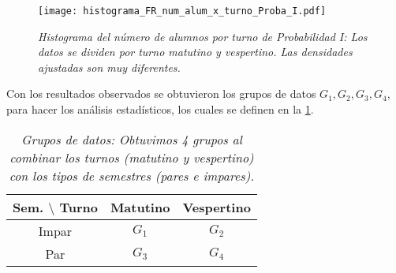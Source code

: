 \begin{figure}[h]
\centering
\texttt{[image: histograma\_FR\_num\_alum\_x\_turno\_Proba\_I.pdf]} %
\caption[\textit{Histograma del número de alumnos por turno: Probabilidad I}]{\textit{Histograma del número de alumnos por turno de Probabilidad I: Los datos se dividen por turno matutino y vespertino. Las densidades ajustadas son muy diferentes.}}\label{HistAlumTurnoProbaI}
\end{figure}

Con los resultados observados se obtuvieron los grupos de datos $G_{1}, G_{2}, G_{3}, G_{4}$, para hacer los análisis estadísticos, los cuales se definen en la \tablename{\ref{GposDatos}}.

\begin{table}[h]
\centering
\begin{tabular}{|c|c|c|}
\hline 
\textbf{Sem.} $\setminus$ \textbf{Turno} & \textbf{Matutino} & \textbf{Vespertino} \\ 
\hline 
Impar & $G_{1}$ & $G_{2}$ \\ 
\hline 
Par & $G_{3}$ & $G_{4}$ \\ 
\hline 
\end{tabular}
\caption[\textit{Grupos de datos}]{\textit{Grupos de datos: Obtuvimos 4 grupos al combinar los turnos (matutino y vespertino) con los tipos de semestres (pares e impares).}}\label{GposDatos}
\end{table}
